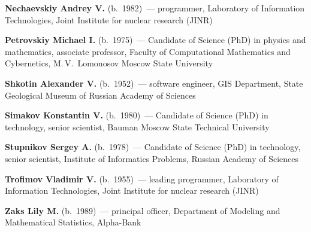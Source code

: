 \begin{multicols}{2}

\vspace*{2pt}



\noindent
\textbf{Nechaevskiy Andrey V.} (b.\ 1982)~--- programmer, Laboratory of Information 
Technologies, Joint Institute for 
nuclear research (JINR) 

\vspace*{2pt}

\noindent
\textbf{Petrovskiy Michael I.} (b.\ 1975)~--- Candidate of Science (PhD) in physics and 
mathematics,  associate professor, Faculty of Computational Mathematics and 
Cybernetics, M.\,V.~Lomonosov Moscow State University

\def\leftkol{ABOUT AUTHORS} %
\def\rightkol{ABOUT AUTHORS} 

\vspace*{2pt}

\noindent
\textbf{Shkotin Alexander V.} (b.\ 1952)~--- software engineer, GIS Department,  State 
Geological Museum of Russian Academy of Sciences

\columnbreak


\noindent
\textbf{Simakov Konstantin V.} (b.\ 1980)~--- Candidate of Science 
(PhD) in technology, senior scientist, Bauman Moscow State Technical 
University


\def\leftkol{ABOUT AUTHORS} %
\def\rightkol{ABOUT AUTHORS} 

\vspace*{7pt}

\noindent
\textbf{Stupnikov Sergey A.} (b.\ 1978)~--- Candidate of Science (PhD) in technology, 
senior scientist, Institute of Informatics Problems, Russian Academy of 
Sciences

\vspace*{7pt}

\noindent
\textbf{Trofimov Vladimir V.} (b.\ 1955)~--- leading programmer, 
Laboratory of Information Technologies, Joint Institute for nuclear research 
(JINR)


\vspace*{7pt}

\noindent
\textbf{Zaks Lily M.} (b.\ 1989)~--- principal officer, Department of Modeling and 
Mathematical Statistics, Alpha-Bank

\def\leftkol{ABOUT AUTHORS} %
\def\rightkol{ABOUT AUTHORS} 


\end{multicols}
\newpage